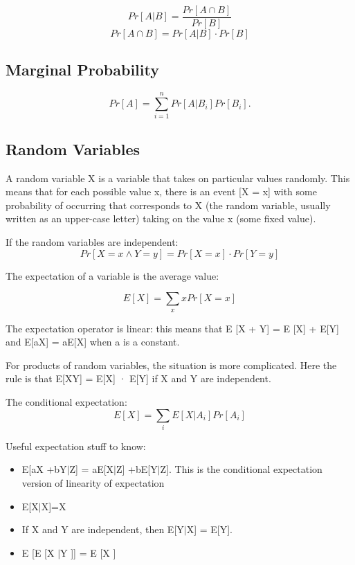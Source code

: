 \documentclass[twoside]{article}
\begin{document}
\begin{equation}
    Pr[A|B]= \frac{Pr[A \cap B]}{Pr[B]}
\end{equation}
\begin{equation}
    Pr [A  \cap B] = Pr [A | B] · Pr [B] 
\end{equation}

\subsection{Marginal Probability}
\begin{equation}
    Pr[A] = \sum_{i=1}^n  Pr[A | B_i]Pr[B_i].
\end{equation}

\subsection{Random Variables}

A random variable X is a variable that takes on particular values randomly. This means that for each possible value x, there is an event [X = x] with some probability of occurring that corresponds to X (the random variable, usually written as an upper-case letter) taking on the value x (some fixed value).


If the random variables are independent:
\begin{equation}
    Pr[X=x \land Y =y]=Pr[X=x]·Pr[Y =y]
\end{equation}

The expectation of a variable is the average value:

\begin{equation}
    E[X] =  \sum_x xPr[X = x]
\end{equation}

The expectation operator is linear: this means that E [X + Y] = E [X] + E[Y] and E[aX] = aE[X] when a is a constant.

For products of random variables, the situation is more complicated. Here the rule
is that E[XY] = E[X] · E[Y] if X and Y are independent.

The conditional expectation:
\begin{equation}
    E[X] =  \sum_i E[X | A_i]Pr[A_i] 
\end{equation}


Useful expectation stuff to know:
\begin{itemize}
    \item E[aX +bY$|$Z] = aE[X$|$Z] +bE[Y$|$Z]. This is the conditional expectation version of linearity of expectation 
	\item E[X$|$X]=X
	\item If X and Y are independent, then E[Y$|$X] = E[Y].
	\item E [E [X $|$Y ]] = E [X ]	
\end{itemize}
\end{document}
